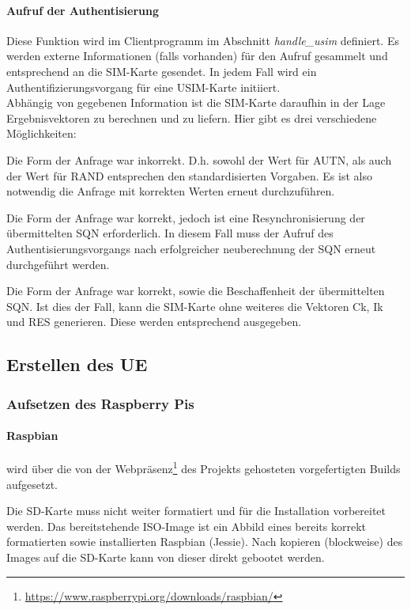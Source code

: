         \paragraph{Aufruf der Authentisierung} Diese Funktion wird im Clientprogramm im Abschnitt
        \textit{handle\_usim} definiert. Es werden externe Informationen (falls vorhanden) für den Aufruf
        gesammelt und entsprechend an die SIM-Karte gesendet. In jedem Fall wird ein Authentifizierungsvorgang
        für eine USIM-Karte initiiert. \\
        Abhängig von gegebenen Information ist die SIM-Karte daraufhin in der Lage Ergebnisvektoren
        zu berechnen und zu liefern. Hier gibt es drei verschiedene Möglichkeiten:

        Die Form der Anfrage war inkorrekt. D.h. sowohl der Wert für AUTN, als auch der Wert für RAND entsprechen
        den standardisierten Vorgaben. Es ist also notwendig die Anfrage mit korrekten Werten erneut
        durchzuführen.

        Die Form der Anfrage war korrekt, jedoch ist eine Resynchronisierung der übermittelten SQN erforderlich.
        In diesem Fall muss der Aufruf des Authentisierungsvorgangs nach erfolgreicher neuberechnung der SQN
        erneut durchgeführt werden.

        Die Form der Anfrage war korrekt, sowie die Beschaffenheit der übermittelten SQN. Ist dies der Fall,
        kann die SIM-Karte ohne weiteres die Vektoren Ck, Ik und RES generieren. Diese werden entsprechend
        ausgegeben.
		
	\subsection{Erstellen des UE}
		\subsubsection{Aufsetzen des Raspberry Pis}
        \label{subsubsec:installpi}
			\paragraph{Raspbian} wird über die von der Webpräsenz\footnote{\url{https://www.raspberrypi.org/downloads/raspbian/}}
            des Projekts gehosteten vorgefertigten Builds aufgesetzt.

            Die SD-Karte muss nicht weiter formatiert und für die Installation vorbereitet werden. Das
            bereitstehende ISO-Image ist ein Abbild eines bereits korrekt formatierten sowie installierten
            Raspbian (Jessie). Nach kopieren (blockweise) des Images auf die SD-Karte kann von dieser direkt
            gebootet werden.

